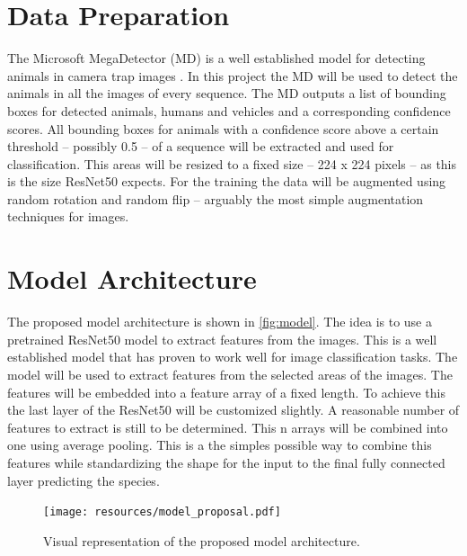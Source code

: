 \documentclass{article}
\begin{document}
\section*{Data Preparation} %

The Microsoft MegaDetector (MD) is a well established model for detecting animals in camera trap images 
\autocite{hernandezPytorchWildlifeCollaborativeDeep2024a, velezChoosingAppropriatePlatform2022, 
schneiderRecognitionEuropeanMammals2024}. In this project the MD will be used to detect the animals in all the images
of every sequence. The MD outputs a list of bounding boxes for detected animals, humans and vehicles 
and a corresponding confidence scores. All bounding boxes for animals with a confidence score above a certain threshold 
-- possibly 0.5 -- of a sequence will be extracted and used for classification. This areas will be resized to a fixed 
size -- 224 x 224 pixels -- as this is the size ResNet50 expects. For the training the data will be augmented 
using random rotation and random flip -- arguably the most simple augmentation techniques for images.

\section*{Model Architecture} %

The proposed model architecture is shown in \autoref{fig:model}. The idea is to use a pretrained ResNet50 model to 
extract features from the images. This is a well established model that has proven to work well for image classification 
tasks. The model will be used to extract features from the selected areas of the images. The features will be embedded 
into a feature array of a fixed length. To achieve this the last layer of the ResNet50 will be customized slightly. 
A reasonable number of features to extract is still to be determined. This n arrays will be combined into one using 
average pooling. This is a the simples possible way to combine this features while standardizing the shape for the input 
to the final fully connected layer predicting the species.

\begin{figure}[ht]
  \centering
  \texttt{[image: resources/model\_proposal.pdf]}
  \caption{Visual representation of the proposed model architecture.}
  \label{fig:model}
\end{figure}
\end{document}
